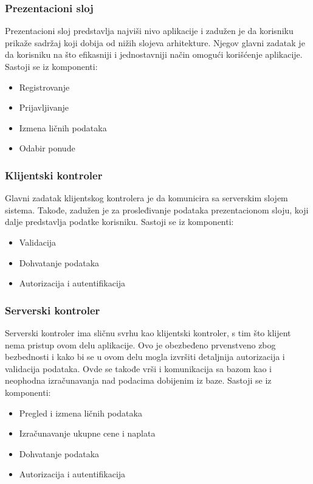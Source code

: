 \documentclass[a4paper]{article}
\begin{document}
\subsubsection{Prezentacioni sloj}

Prezentacioni sloj predstavlja najviši nivo aplikacije i zadužen je da korisniku prikaže sadržaj koji dobija od nižih slojeva arhitekture. Njegov glavni zadatak je da korisniku na što efikasniji i jednostavniji način omogući korišćenje aplikacije.
\newline
Sastoji se iz komponenti:
\begin{itemize}

\item Registrovanje
\item Prijavljivanje
\item Izmena ličnih podataka
\item Odabir ponude

\end{itemize}
\subsubsection{Klijentski kontroler}

Glavni zadatak klijentskog kontrolera je da komunicira sa serverskim slojem sistema. Takođe, zadužen je za prosleđivanje podataka prezentacionom sloju, koji dalje predstavlja podatke korisniku.
\newline
Sastoji se iz komponenti:
\begin{itemize}
\item Validacija
\item Dohvatanje podataka
\item Autorizacija i autentifikacija
\end{itemize}



\subsubsection{Serverski kontroler}

Serverski kontroler ima sličnu svrhu kao klijentski kontroler, s tim što klijent nema pristup ovom delu aplikacije. Ovo je obezbeđeno prvenstveno zbog bezbednosti i kako bi se u ovom delu mogla izvršiti detaljnija autorizacija i validacija podataka. Ovde se takođe vrši i komunikacija sa bazom kao i neophodna izračunavanja nad podacima dobijenim iz baze. 
\newline
Sastoji se iz komponenti:
\begin{itemize}
\item Pregled i izmena ličnih podataka
\item Izračunavanje ukupne cene i naplata
\item Dohvatanje podataka
\item Autorizacija i autentifikacija
\end{itemize}
\end{document}
